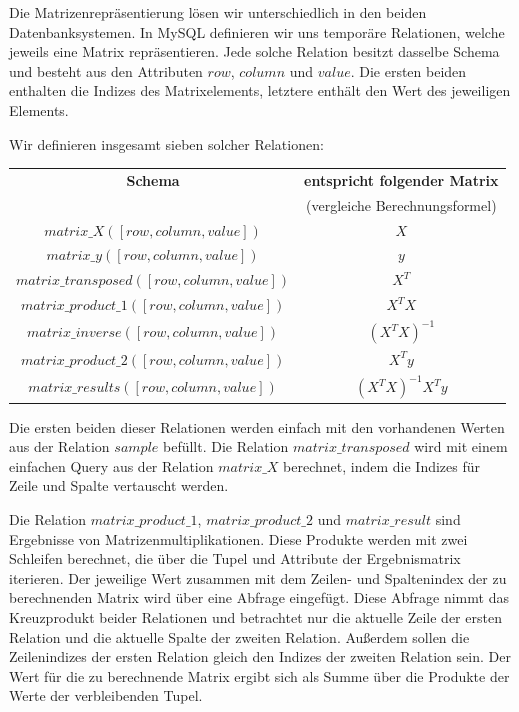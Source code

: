 Die Matrizenrepräsentierung lösen wir unterschiedlich in den beiden Datenbanksystemen. In MySQL definieren wir uns temporäre Relationen, welche jeweils eine Matrix repräsentieren. Jede solche Relation besitzt dasselbe Schema und besteht aus den Attributen $row$, $column$ und $value$. Die ersten beiden enthalten die Indizes des Matrixelements, letztere enthält den Wert des jeweiligen Elements.

Wir definieren insgesamt sieben solcher Relationen:
\begin{center}
  \begin{tabular}{|c|c|}\hline
    \textbf{Schema} & \textbf{entspricht folgender Matrix} \\
     &  (vergleiche Berechnungsformel) \\ \hline
    $matrix\_X([row, column, value])$ & $X$ \\ \hline
    $matrix\_y([row, column, value])$ & $y$ \\ \hline
    $matrix\_transposed([row, column, value])$ & $X^T$ \\ \hline
    $matrix\_product\_1([row, column, value])$ & $X^T X$ \\ \hline
    $matrix\_inverse([row, column, value])$ & $(X^T X)^{-1}$ \\ \hline
    $matrix\_product\_2([row, column, value])$ & $X^T y$ \\ \hline
    $matrix\_results([row, column, value])$ & $(X^T X)^{-1} X^T y$ \\ \hline
  \end{tabular}
\end{center}

Die ersten beiden dieser Relationen werden einfach mit den vorhandenen Werten aus der Relation $sample$ befüllt. Die Relation $matrix\_transposed$ wird mit einem einfachen Query aus der Relation $matrix\_X$ berechnet, indem die Indizes für Zeile und Spalte vertauscht werden.

Die Relation $matrix\_product\_1$, $matrix\_product\_2$ und $matrix\_result$ sind Ergebnisse von Matrizenmultiplikationen. Diese Produkte werden mit zwei Schleifen berechnet, die über die Tupel und Attribute der Ergebnismatrix iterieren. Der jeweilige Wert zusammen mit dem Zeilen- und Spaltenindex der zu berechnenden Matrix wird über eine Abfrage eingefügt. Diese Abfrage nimmt das Kreuzprodukt beider Relationen und betrachtet nur die aktuelle Zeile der ersten Relation und die aktuelle Spalte der zweiten Relation. Außerdem sollen die Zeilenindizes der ersten Relation gleich den Indizes der zweiten Relation sein. Der Wert für die zu berechnende Matrix ergibt sich als Summe über die Produkte der Werte der verbleibenden Tupel.

